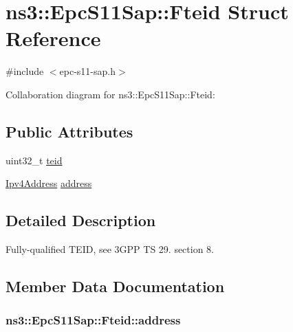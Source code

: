 \hypertarget{structns3_1_1EpcS11Sap_1_1Fteid}{}\section{ns3\+:\+:Epc\+S11\+Sap\+:\+:Fteid Struct Reference}
\label{structns3_1_1EpcS11Sap_1_1Fteid}


{\ttfamily \#include $<$epc-\/s11-\/sap.\+h$>$}



Collaboration diagram for ns3\+:\+:Epc\+S11\+Sap\+:\+:Fteid\+:
\subsection*{Public Attributes}
\begin{DoxyCompactItemize}
\item 
uint32\+\_\+t \hyperlink{structns3_1_1EpcS11Sap_1_1Fteid_a74034d69304ed0303407c9c64ace32ee}{teid}
\item 
\hyperlink{classns3_1_1Ipv4Address}{Ipv4\+Address} \hyperlink{structns3_1_1EpcS11Sap_1_1Fteid_a6287988885618f62a1a358bf34100a19}{address}
\end{DoxyCompactItemize}


\subsection{Detailed Description}
Fully-\/qualified T\+E\+ID, see 3\+G\+PP TS 29. section 8. 

\subsection{Member Data Documentation}
\subsubsection[{\texorpdfstring{address}{address}}]{ ns3\+::\+Epc\+S11\+Sap\+::\+Fteid\+::address}\hypertarget{structns3_1_1EpcS11Sap_1_1Fteid_a6287988885618f62a1a358bf34100a19}{}\label{structns3_1_1EpcS11Sap_1_1Fteid_a6287988885618f62a1a358bf34100a19}
